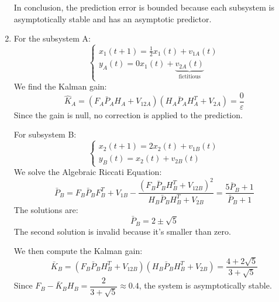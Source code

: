 \begin{enumerate}
        In conclusion, the prediction error is bounded because each subsystem is asymptotically stable and has an asymptotic predictor.
    \item For the subsystem A: 
        \[\begin{cases}
            x_1(t+1)=\frac{1}{2}x_1(t)+v_{1A}(t) \\
            y_A(t)=0x_1(t)+\underbrace{v_{2A}(t)}_{\text{fictitious}} 
        \end{cases}\]
        We find the Kalman gain:
        \[\hat{K}_A=(F_A\bar{P}_AH_A+V_{12A})(H_A\bar{P}_AH_A^T+V_{2A})=\dfrac{0}{\varepsilon}\]
        Since the gain is null, no correction is applied to the prediction.

        For subsystem B:
        \[\begin{cases}
            x_2(t+1)=2x_2(t)+v_{1B}(t) \\
            y_B(t)=x_2(t)+v_{2B}(t)
        \end{cases}\]
        We solve the Algebraic Riccati Equation: 
        \[\bar{P}_B=F_B\bar{P}_BF_B^T+V_{1B}-\dfrac{\left(F_B\bar{P}_BH_B^T+V_{12B}\right)^2}{H_B\bar{P}_BH_B^T+V_{2B}}=\dfrac{5\bar{P}_B+1}{\bar{P}_B+1}\]
        The solutions are: 
        \[\bar{P}_B=2\pm\sqrt{5}\]
        The second solution is invalid because it's smaller than zero.

        We then compute the Kalman gain:
        \[\bar{K}_B=\left(F_B\bar{P}_BH_B^T+V_{12B}\right)\left(H_B\bar{P}_BH_B^T+V_{2B}\right)=\dfrac{4+2\sqrt{5}}{3+\sqrt{5}}\]
        Since $F_B-\bar{K}_BH_B=\dfrac{2}{3+\sqrt{5}}\approx 0.4$, the system is asymptotically stable.


\end{enumerate}
